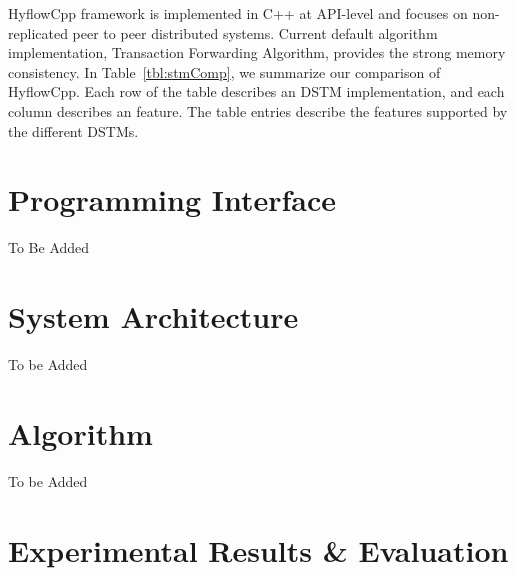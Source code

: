 \documentclass[12pt,english]{report}
\begin{document}
HyflowCpp framework is implemented in C++ at API-level and focuses on non-replicated peer to peer distributed systems. Current default algorithm implementation, Transaction Forwarding Algorithm, provides the strong memory consistency. In Table~\ref{tbl:stmComp}, we summarize our comparison of HyflowCpp. Each row of the table describes an DSTM implementation, and each column describes an feature. The table entries describe the features supported by the different DSTMs.

\chapter{Programming Interface}\label{chap:progInterface}

To Be Added



\chapter{System Architecture}\label{chap:sysArch}

To be Added

\chapter{Algorithm}\label{chap:algorithm}

To be Added

\chapter{Experimental Results \& Evaluation}\label{chap:expResults}
\end{document}
